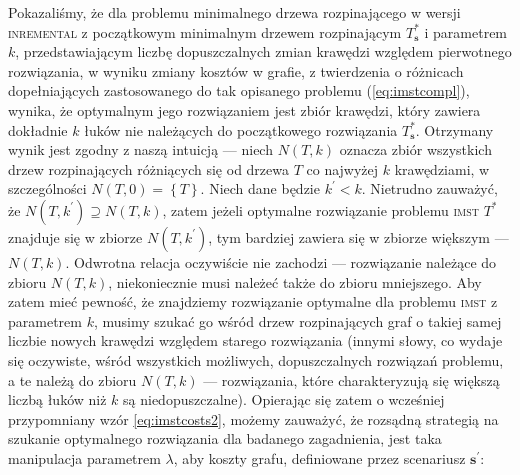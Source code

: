 Pokazaliśmy, że dla problemu minimalnego drzewa rozpinającego w wersji \textsc{inremental} z początkowym minimalnym drzewem rozpinającym $T^{\ast}_{\textbf{s}}$ i parametrem $k$, przedstawiającym liczbę dopuszczalnych zmian krawędzi względem pierwotnego rozwiązania, w wyniku zmiany kosztów w grafie, z twierdzenia o różnicach dopełniających zastosowanego do tak opisanego problemu (\ref{eq:imstcompl}), wynika, że optymalnym jego rozwiązaniem jest zbiór krawędzi, który zawiera dokładnie $k$ łuków nie należących do początkowego rozwiązania $T^{\ast}_{\textbf{s}}$. Otrzymany wynik jest zgodny z naszą intuicją --- niech $N \left( T, k \right)$ oznacza zbiór wszystkich drzew rozpinających różniących się od drzewa $T$ co najwyżej $k$ krawędziami, w szczególności $N \left( T, 0 \right) = \left\{ T \right\}$. Niech dane będzie $k^{\prime} < k$. Nietrudno zauważyć, że $N \left( T, k^{\prime} \right) \supseteq N \left( T, k \right)$, zatem jeżeli optymalne rozwiązanie problemu \textsc{imst} $T^{\ast}$ znajduje się w zbiorze $N \left( T, k^{\prime} \right)$, tym bardziej zawiera się w zbiorze większym --- $N \left( T, k \right)$. Odwrotna relacja oczywiście nie zachodzi --- rozwiązanie należące do zbioru $N \left( T, k \right)$, niekoniecznie musi należeć także do zbioru mniejszego. Aby zatem mieć pewność, że znajdziemy rozwiązanie optymalne dla problemu \textsc{imst} z parametrem $k$, musimy szukać go wśród drzew rozpinających graf o takiej samej liczbie nowych krawędzi względem starego rozwiązania (innymi słowy, co wydaje się oczywiste, wśród wszystkich możliwych, dopuszczalnych rozwiązań problemu, a te należą do zbioru $N \left( T, k \right)$ --- rozwiązania, które charakteryzują się większą liczbą łuków niż $k$ są niedopuszczalne). Opierając się zatem o wcześniej przypomniany wzór \ref{eq:imstcosts2}, możemy zauważyć, że rozsądną strategią na szukanie optymalnego rozwiązania dla badanego zagadnienia, jest taka manipulacja parametrem $\lambda$, aby koszty grafu, definiowane przez scenariusz $\textbf{s}^{\prime}$:

